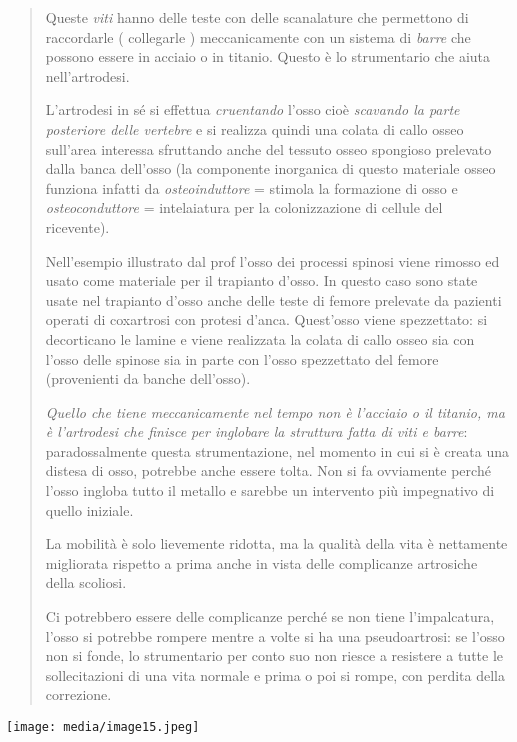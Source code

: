 \documentclass[]{article}
\begin{document}
\begin{quote}
Queste \emph{viti} hanno delle teste con delle scanalature che
permettono di raccordarle ( collegarle ) meccanicamente con un sistema
di \emph{barre} che possono essere in acciaio o in titanio. Questo è lo
strumentario che aiuta nell'artrodesi.

L'artrodesi in sé si effettua \emph{cruentando} l'osso cioè
\emph{scavando la parte posteriore delle vertebre} e si realizza quindi
una colata di callo osseo sull'area interessa sfruttando anche del
tessuto osseo spongioso prelevato dalla banca dell'osso (la componente
inorganica di questo materiale osseo funziona infatti da
\emph{osteoinduttore} = stimola la formazione di osso e
\emph{osteoconduttore} = intelaiatura per la colonizzazione di cellule
del ricevente).

Nell'esempio illustrato dal prof l'osso dei processi spinosi viene
rimosso ed usato come materiale per il trapianto d'osso. In questo caso
sono state usate nel trapianto d'osso anche delle teste di femore
prelevate da pazienti operati di coxartrosi con protesi d'anca.
Quest'osso viene spezzettato: si decorticano le lamine e viene
realizzata la colata di callo osseo sia con l'osso delle spinose sia in
parte con l'osso spezzettato del femore (provenienti da banche
dell'osso).

\emph{Quello che tiene meccanicamente nel tempo non è l'acciaio o il
titanio, ma è l'artrodesi che finisce per inglobare la struttura fatta
di viti e barre}: paradossalmente questa strumentazione, nel momento in
cui si è creata una distesa di osso, potrebbe anche essere tolta. Non si
fa ovviamente perché l'osso ingloba tutto il metallo e sarebbe un
intervento più impegnativo di quello iniziale.

La mobilità è solo lievemente ridotta, ma la qualità della vita è
nettamente migliorata rispetto a prima anche in vista delle complicanze
artrosiche della scoliosi.

Ci potrebbero essere delle complicanze perché se non tiene
l'impalcatura, l'osso si potrebbe rompere mentre a volte si ha una
pseudoartrosi: se l'osso non si fonde, lo strumentario per conto suo non
riesce a resistere a tutte le sollecitazioni di una vita normale e prima
o poi si rompe, con perdita della correzione.
\end{quote}

\texttt{[image: media/image15.jpeg]}
\end{document}
